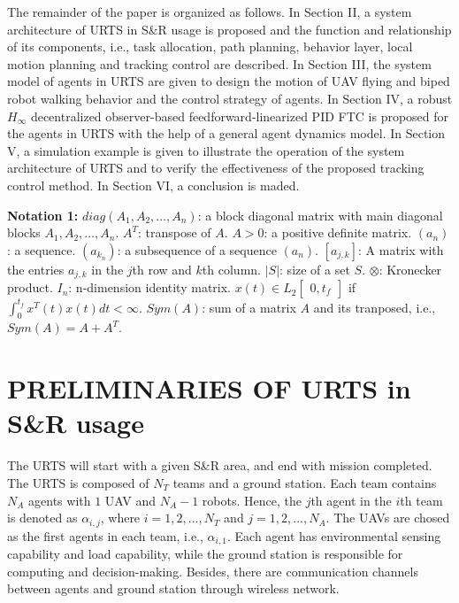\documentclass{ieeeaccess}
\begin{document}
The remainder of the paper is organized as follows. In Section II, a system architecture of URTS in S\&R usage is proposed and the function and relationship of its components, i.e., task allocation, path planning, behavior layer, local motion planning and tracking control are described. In Section III, the system model of agents in URTS are given to design the motion of UAV flying and biped robot walking behavior and the control strategy of agents. In Section IV, a robust $H_\infty$ decentralized observer-based feedforward-linearized PID FTC is proposed for the agents in URTS with the help of a general agent dynamics model. In Section V, a simulation example is given to illustrate the operation of the system architecture of URTS and to verify the effectiveness of the proposed tracking control method. In Section VI, a conclusion is maded.

\textbf{Notation 1:} 
$diag(A_1, A_2, \dots, A_n)$: a block diagonal matrix with main diagonal blocks $A_1, A_2, \dots, A_n$. $A^T$: transpose of $A$. $A > 0$: a positive definite matrix. $(a_n)$: a sequence. $(a_{k_n})$: a subsequence of a sequence $(a_n)$. $[a_{j,k}]$: A matrix with the entries $a_{j,k}$ in the $j$th row and $k$th column. $\vert{S}\vert$: size of a set $S$. $\otimes$: Kronecker product. $I_n$: n-dimension identity matrix. $x(t)\in L_2\begin{bmatrix}
    0,t_f 
\end{bmatrix}$ if $\int^{t_f}_{0}x^T(t)x(t)dt<\infty$. $Sym(A)$: sum of a matrix $A$ and its tranposed, i.e., $Sym(A) = A+A^T$.

\section{PRELIMINARIES OF URTS in S\&R usage}
The URTS will start with a given S\&R area, and end with mission completed. The URTS is composed of $N_T$ teams and a ground station. Each team contains $N_A$ agents with $1$ UAV and $N_A-1$ robots. Hence, the $j$th agent in the $i$th team is denoted as $\alpha_{i,j}$, where $i=1,2,...,N_T$ and $j=1,2,...,N_A$. The UAVs are chosed as the first agents in each team, i.e., $\alpha_{i,1}$. Each agent has environmental sensing capability and load capability, while the ground station is responsible for computing and decision-making. Besides, there are communication channels between agents and ground station through wireless network.
\end{document}
